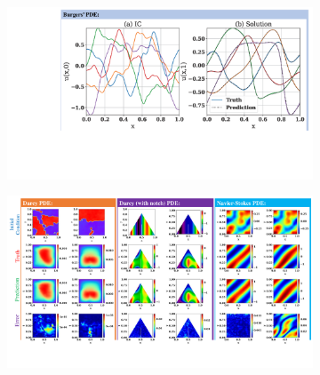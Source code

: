 \documentclass{article}
\begin{document}
\begin{figure}[ht!]
	\centering
	\begin{subfigure}[b]{0.7\textwidth}
         \centering
         \includegraphics[width=\textwidth]{Results12.pdf}
     \end{subfigure}
     \begin{subfigure}[b]{\textwidth}
         \centering
         \includegraphics[width=\textwidth]{Results1.pdf}
     \end{subfigure}

\end{figure}
\end{document}
